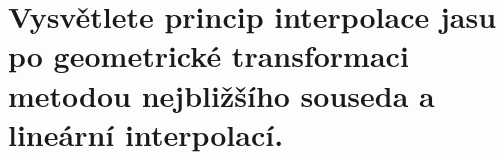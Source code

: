 \section{Vysvětlete princip interpolace jasu po geometrické transformaci metodou nejbližšího souseda a lineární 
interpolací.}